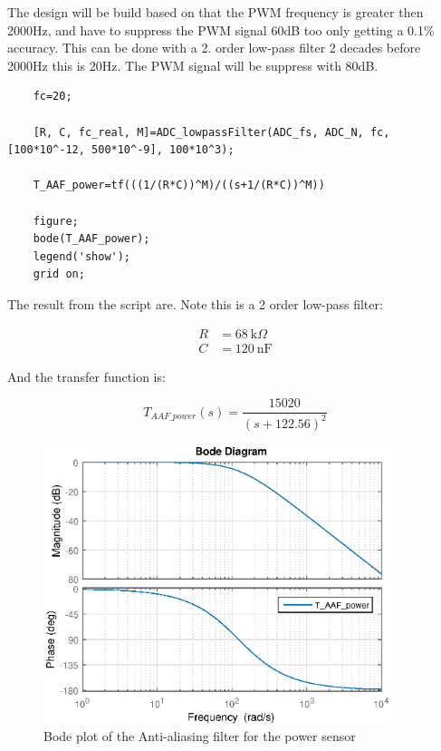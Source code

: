 	
	The design will be build based on that the PWM frequency is greater then 2000Hz, and have to suppress the PWM signal 60dB too only getting a 0.1\% accuracy. This can be done with a 2. order low-pass filter 2 decades before 2000Hz this is 20Hz. The PWM signal will be suppress with 80dB.
	
	\begin{lstlisting}
	fc=20;
	
	[R, C, fc_real, M]=ADC_lowpassFilter(ADC_fs, ADC_N, fc, [100*10^-12, 500*10^-9], 100*10^3);
	
	T_AAF_power=tf(((1/(R*C))^M)/((s+1/(R*C))^M))
	
	figure;
	bode(T_AAF_power);
	legend('show');
	grid on;
	\end{lstlisting}

	The result from the script are. Note this is a 2 order low-pass filter:
	
	\begin{equation}
	\begin{split}
	R &= \SI{68}{\kilo\Omega}\\
	C &= \SI{120}{\nano\F}
	\end{split}
	\end{equation}
	
	And the transfer function is: 
	
	\begin{equation}
	T_{{AAF\_power}}(s) = \frac{15020}{{(s + 122.56)}^{2}}
	\end{equation}
	
	\begin{figure}[H]
		\centering
		\includegraphics [width=4in]{Hardware/Pictures/FilterAnalyse_02.eps}
		\caption{Bode plot of the Anti-aliasing filter for the power sensor}
		\label{fig:BODE_AAF_power}
	\end{figure}

